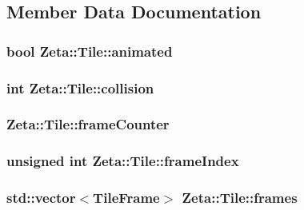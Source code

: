 \subsection{Member Data Documentation}
\hypertarget{classZeta_1_1Tile_abbdf92d372e2f64b3d5fdbbcd802c65d}{
\subsubsection[{animated}]{\setlength{\rightskip}{0pt plus 5cm}bool Zeta\+::\+Tile\+::animated\hspace{0.3cm}{\ttfamily [protected]}}}\label{classZeta_1_1Tile_abbdf92d372e2f64b3d5fdbbcd802c65d}
\hypertarget{classZeta_1_1Tile_a14528e0a0089ba6d1ef9c7212b0979ef}{
\subsubsection[{collision}]{\setlength{\rightskip}{0pt plus 5cm}int Zeta\+::\+Tile\+::collision\hspace{0.3cm}{\ttfamily [protected]}}}\label{classZeta_1_1Tile_a14528e0a0089ba6d1ef9c7212b0979ef}
\hypertarget{classZeta_1_1Tile_a75c9f1e8284016d616ff77d45be4b4c7}{
\subsubsection[{frame\+Counter}]{ Zeta\+::\+Tile\+::frame\+Counter\hspace{0.3cm}{\ttfamily [protected]}}}\label{classZeta_1_1Tile_a75c9f1e8284016d616ff77d45be4b4c7}
\hypertarget{classZeta_1_1Tile_a82054179dbf538fb3f4fb90d27f3c989}{
\subsubsection[{frame\+Index}]{\setlength{\rightskip}{0pt plus 5cm}unsigned int Zeta\+::\+Tile\+::frame\+Index\hspace{0.3cm}{\ttfamily [protected]}}}\label{classZeta_1_1Tile_a82054179dbf538fb3f4fb90d27f3c989}
\hypertarget{classZeta_1_1Tile_a7bb5f244f2fcfd4d1555b1fc34ed83bf}{
\subsubsection[{frames}]{\setlength{\rightskip}{0pt plus 5cm}std\+::vector$<${\bf Tile\+Frame}$>$ Zeta\+::\+Tile\+::frames\hspace{0.3cm}{\ttfamily [protected]}}}\label{classZeta_1_1Tile_a7bb5f244f2fcfd4d1555b1fc34ed83bf}
